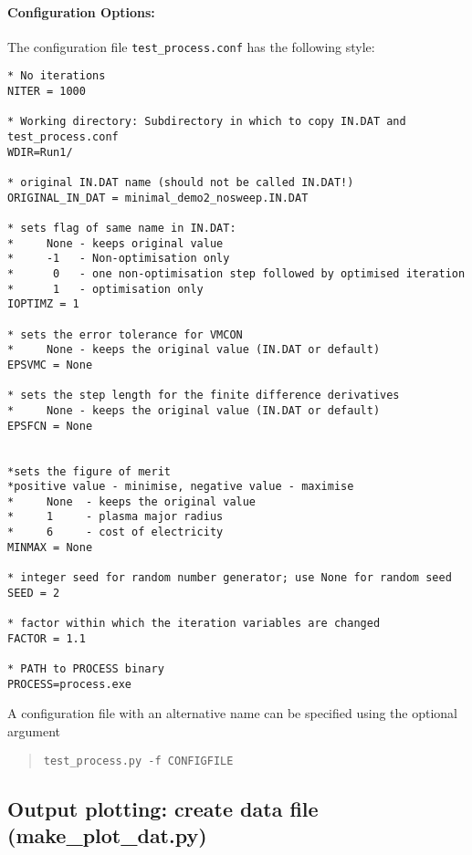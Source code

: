 \paragraph{Configuration Options:}

The configuration file \texttt{test\_process.conf} has the following style:
\begin{framed}
\begin{verbatim}
* No iterations
NITER = 1000

* Working directory: Subdirectory in which to copy IN.DAT and test_process.conf
WDIR=Run1/

* original IN.DAT name (should not be called IN.DAT!)
ORIGINAL_IN_DAT = minimal_demo2_nosweep.IN.DAT

* sets flag of same name in IN.DAT:
*     None - keeps original value
*     -1   - Non-optimisation only
*      0   - one non-optimisation step followed by optimised iteration
*      1   - optimisation only
IOPTIMZ = 1

* sets the error tolerance for VMCON
*     None - keeps the original value (IN.DAT or default)
EPSVMC = None

* sets the step length for the finite difference derivatives
*     None - keeps the original value (IN.DAT or default)
EPSFCN = None


*sets the figure of merit
*positive value - minimise, negative value - maximise
*     None  - keeps the original value
*     1     - plasma major radius
*     6	    - cost of electricity
MINMAX = None

* integer seed for random number generator; use None for random seed
SEED = 2

* factor within which the iteration variables are changed
FACTOR = 1.1

* PATH to PROCESS binary
PROCESS=process.exe
\end{verbatim}
\end{framed}

A configuration file with an alternative name can be specified using the optional argument
\begin{quote}
\begin{verbatim}
test_process.py -f CONFIGFILE
\end{verbatim}
\end{quote}


\subsection{Output plotting: create data file (make\_plot\_dat.py)}

